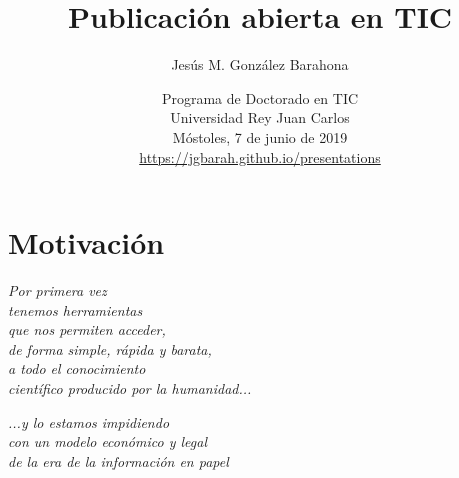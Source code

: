 \documentclass[17pt,aspectratio=169]{beamer}
\begin{document}
\title{Publicación abierta en TIC}
\author{Jesús M. González Barahona}

\date{Programa de Doctorado en TIC \\
  Universidad Rey Juan Carlos \\
  Móstoles, 7 de junio de 2019\\
{\small \url{https://jgbarah.github.io/presentations}} \\}

\frame{
\maketitle
}




\section{Motivación}

\begin{frame}

  {\em \Large
    Por primera vez \\
    tenemos herramientas \\
    que nos permiten acceder, \\
    de forma simple, rápida y barata, \\
    a todo el conocimiento \\
    científico producido por la humanidad...\\
  }
  
\end{frame}

\begin{frame}

  {\em \Large
    ...y lo estamos impidiendo \\
    con un modelo económico y legal \\
    de la era de la información en papel \\
  }
  
\end{frame}
\end{document}
